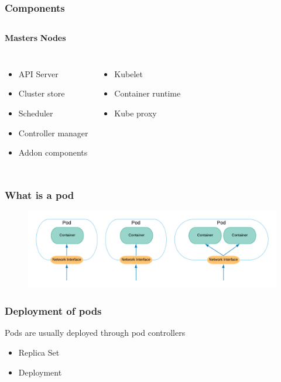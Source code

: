 \documentclass{beamer}
\begin{document}
\begin{frame}
    \frametitle{Components}
    \begin{columns}
    \textbf{Masters}
    \textbf{Nodes}
    \end{columns}
    \begin{columns}
    \begin{itemize}
        \item API Server
        \item Cluster store
        \item Scheduler
        \item Controller manager
        \item Addon components
    \end{itemize}
    \begin{itemize}
        \item Kubelet
        \item Container runtime
        \item Kube proxy
    \end{itemize}
    \end{columns}
\end{frame}


\begin{frame}
\frametitle{What is a pod}
    \begin{figure}
        \includegraphics[width=\linewidth]{images/Pods.png}
    \end{figure}
\end{frame}

\begin{frame}
\frametitle{Deployment of pods}
Pods are usually deployed through pod controllers
\begin{itemize}
    \item Replica Set
    \item Deployment
\end{itemize}
\end{frame}
\end{document}

